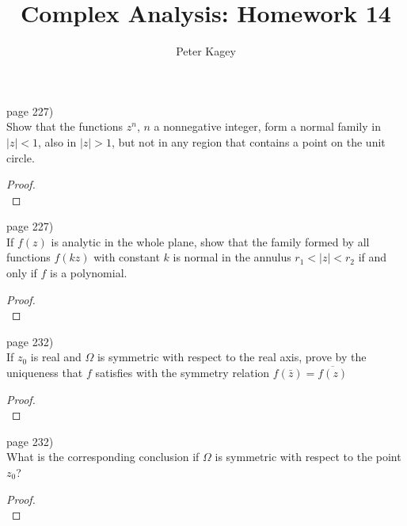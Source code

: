 \documentclass{article}
\newenvironment{problem}[2][Problem]{\begin{trivlist}
\item[\hskip \labelsep {\bfseries #1}\hskip \labelsep {\bfseries #2.}]}{\end{trivlist}}
\begin{document}
\title{Complex Analysis: Homework 14}
\author{Peter Kagey}

\maketitle

\begin{problem}{2} (page 227) \\
  Show that the functions $z^n$, $n$ a nonnegative integer, form a normal family
  in $|z| < 1$, also in $|z| > 1$, but not in any region that contains a point
  on the unit circle.
\end{problem}
\begin{proof} \text{} \\
\end{proof}
\pagebreak

\begin{problem}{3} (page 227) \\
  If $f(z)$ is analytic in the whole plane, show that the family formed by all
  functions $f(kz)$ with constant $k$ is normal in the annulus $r_1 < |z| < r_2$
  if and only if $f$ is a polynomial.
\end{problem}
\begin{proof} \text{} \\
\end{proof}
\pagebreak

\begin{problem}{1} (page 232) \\
  If $z_0$ is real and $\Omega$ is symmetric with respect to the real axis,
  prove by the uniqueness that $f$ satisfies with the symmetry relation
  $f(\bar{z}) = \overline{f(z)}$
\end{problem}
\begin{proof} \text{} \\
\end{proof}
\pagebreak

\begin{problem}{2} (page 232) \\
  What is the corresponding conclusion if $\Omega$ is symmetric with respect to
  the point $z_0$?
\end{problem}
\begin{proof} \text{} \\
\end{proof}
\end{document}

